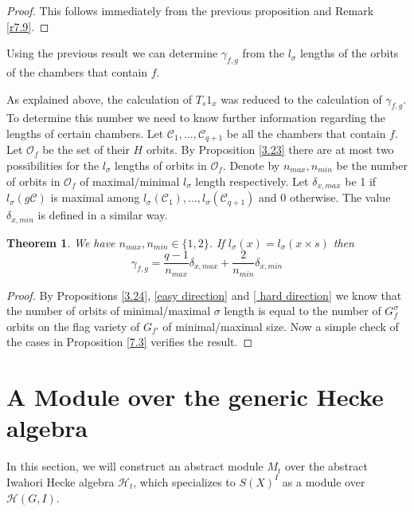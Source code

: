 \documentclass[12pt]{article}
\newcommand{\C}{\mathcal{C}}
\newcommand{\s}{\mathcal{O}}
\newcommand{\<}{\langle}
\renewcommand{\>}{\rangle}
\theoremstyle{plain}
\newtheorem{theorem}{Theorem}[section] %
\theoremstyle{definition}
\begin{document}
\begin{proof}
    This follows immediately from the previous proposition and Remark \ref{r7.9}.
\end{proof}




Using the previous result we can determine $\gamma_{f,g}$ from the $l_\sigma$ lengths of the orbits of the chambers that contain $f$.

As explained above, the calculation of $T_{s}1_{x}$ was reduced to the calculation of $\gamma_{f,g}$. To determine this number we need to know further information regarding the lengths of certain chambers.
Let $\C_1,...,\C_{q+1}$ be all the chambers that contain $f$.
Let $\s_f$ be the set of their $H$ orbits. By Proposition \ref{3.23} there are at most two possibilities for the $l_\sigma$ lengths of orbits in $\s_f$. Denote by $n_{max},n_{min}$ be the number of orbits in $\s_f$ of maximal/minimal $l_\sigma$ length respectively. Let $\delta_{x,max}$ be 1 if $l_\sigma(g\C)$ is maximal among $l_\sigma(\C_1),...,l_\sigma(\C_{q+1})$ and $0$ otherwise. The value $\delta_{x,min}$ is defined in a similar way. 

\begin{theorem}\label{3.25}
We have $n_{max},n_{min}\in\{1,2\}$.
If $l_\sigma(x)= l_\sigma(x\times s)$ then $$\gamma_{f,g}=\frac{q-1}{n_{max}}\delta_{x,max}+\frac{2}{n_{min}}\delta_{x,min}$$

\end{theorem}

\begin{proof}

By Propositions \ref{3.24}, \ref{easy direction} and \ref{ hard direction} we know that the number of orbits of minimal/maximal $\sigma$ length is equal to the number of $G^\sigma_f$ orbits on the flag variety of $G_{f'}$ of minimal/maximal size. Now a simple check of the cases in Proposition \ref{7.3} verifies the result.

\end{proof}



\section{A Module over the generic Hecke algebra}
    
In this section, we will construct an abstract module $M_t$ over the abstract Iwahori Hecke algebra $\mathcal{H}_t$, which specializes to $S(X)^I$ as a module over $\mathcal{H}(G,I)$.
\end{document}
